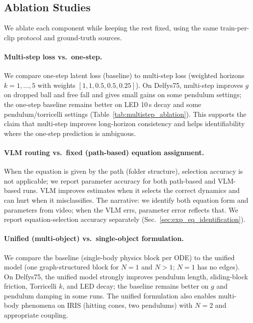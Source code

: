 \subsection{Ablation Studies}
\label{sec:ablations}

We ablate each component while keeping the rest fixed, using the same train-per-clip protocol and ground-truth sources.

\paragraph{Multi-step loss vs.\ one-step.} We compare one-step latent loss (baseline) to multi-step loss (weighted horizons $k=1,\ldots,5$ with weights $[1, 1, 0.5, 0.5, 0.25]$). On Delfys75, multi-step improves $g$ on dropped ball and free fall and gives small gains on some pendulum settings; the one-step baseline remains better on LED 10\,s decay and some pendulum/torricelli settings (Table~\ref{tab:multistep_ablation}). This supports the claim that multi-step improves long-horizon consistency and helps identifiability where the one-step prediction is ambiguous.

\paragraph{VLM routing vs.\ fixed (path-based) equation assignment.} When the equation is given by the path (folder structure), selection accuracy is not applicable; we report parameter accuracy for both path-based and VLM-based runs. VLM improves estimates when it selects the correct dynamics and can hurt when it misclassifies. The narrative: we identify both equation form and parameters from video; when the VLM errs, parameter error reflects that. We report equation-selection accuracy separately (Sec.~\ref{sec:exp_eq_identification}).

\paragraph{Unified (multi-object) vs.\ single-object formulation.} We compare the baseline (single-body physics block per ODE) to the unified model (one graph-structured block for $N=1$ and $N>1$; $N=1$ has no edges). On Delfys75, the unified model strongly improves pendulum length, sliding-block friction, Torricelli $k$, and LED decay; the baseline remains better on $g$ and pendulum damping in some runs. The unified formulation also enables multi-body phenomena on IRIS (hitting cones, two pendulums) with $N=2$ and appropriate coupling.

